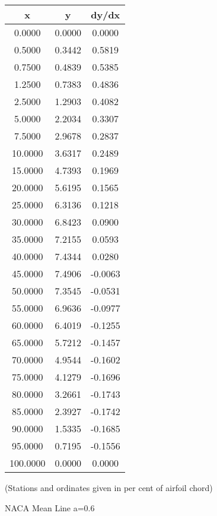\documentclass[11pt]{book}
\begin{document}
 \vspace{8mm}
 \begin{tabular}{|c|c|c|}  \hline
 x & y & dy/dx \\
 \hline
0.0000 & 0.0000 & 0.0000 \\
0.5000 & 0.3442 & 0.5819 \\
0.7500 & 0.4839 & 0.5385 \\
1.2500 & 0.7383 & 0.4836 \\
2.5000 & 1.2903 & 0.4082 \\
5.0000 & 2.2034 & 0.3307 \\
7.5000 & 2.9678 & 0.2837 \\
10.0000 & 3.6317 & 0.2489 \\
15.0000 & 4.7393 & 0.1969 \\
20.0000 & 5.6195 & 0.1565 \\
25.0000 & 6.3136 & 0.1218 \\
30.0000 & 6.8423 & 0.0900 \\
35.0000 & 7.2155 & 0.0593 \\
40.0000 & 7.4344 & 0.0280 \\
45.0000 & 7.4906 & -0.0063 \\
50.0000 & 7.3545 & -0.0531 \\
55.0000 & 6.9636 & -0.0977 \\
60.0000 & 6.4019 & -0.1255 \\
65.0000 & 5.7212 & -0.1457 \\
70.0000 & 4.9544 & -0.1602 \\
75.0000 & 4.1279 & -0.1696 \\
80.0000 & 3.2661 & -0.1743 \\
85.0000 & 2.3927 & -0.1742 \\
90.0000 & 1.5335 & -0.1685 \\
95.0000 & 0.7195 & -0.1556 \\
100.0000 & 0.0000 & 0.0000 \\
 \hline
 \end{tabular}
 \vspace{8mm}

(Stations and ordinates given in per cent of airfoil chord)

 \newpage
 \label{mla=0.6}
 \begin{Large}
 NACA Mean Line a=0.6
 \end{Large}
  
\end{document}
